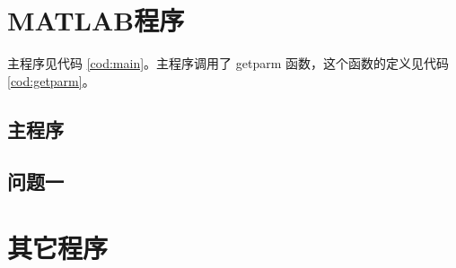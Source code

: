\setlength{\parskip}{3pt}
\section{MATLAB程序}\label{sec:cod}
主程序见代码 \ref{cod:main}。主程序调用了 getparm 函数，这个函数的定义见代码 \ref{cod:getparm}。

\subsection{主程序}


\subsection{问题一}


\section{其它程序}



